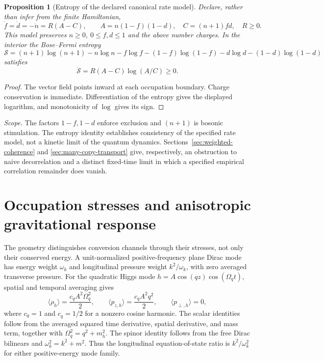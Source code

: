 \documentclass[11pt,a4paper,oneside]{book}
\theoremstyle{plain}
\newtheorem{proposition}[theorem]{Proposition}
\theoremstyle{definition}
\theoremstyle{remark}
\newcommand{\src}[2]{\cite{#1}}
\newcommand{\scope}[1]{\par\smallskip\noindent\textit{Scope.} #1\par\smallskip}
\begin{document}
\begin{proposition}[Entropy of the declared canonical rate model]
\label{prop:pauli-entropy}
Declare, rather than infer from the finite Hamiltonian,
\begin{equation}
 \dot f=\dot d=-\dot n=R(A-C),\qquad
 A=n(1-f)(1-d),\quad C=(n+1)fd,\quad R\ge0.
 \label{eq:canonical-rate-model}
\end{equation}
This model preserves $n\ge0$, $0\le f,d\le1$ and the above number
charges.  In the interior the Bose--Fermi entropy
\[
 \mathcal S=(n+1)\log(n+1)-n\log n
 -f\log f-(1-f)\log(1-f)-d\log d-(1-d)\log(1-d)
\]
satisfies
\begin{equation}
 \dot{\mathcal S}=R(A-C)\log(A/C)\ge0.
 \label{eq:pauli-entropy}
\end{equation}
\end{proposition}
\begin{proof}
The vector field points inward at each occupation boundary.  Charge
conservation is immediate.  Differentiation of the entropy gives the
displayed logarithm, and monotonicity of $\log$ gives its sign.
\end{proof}
\src{R20}{prop:v20v44-entropy}

\scope{The factors $1-f,1-d$ enforce exclusion and $(n+1)$ is bosonic
stimulation.  The entropy identity establishes consistency of the
specified rate model, not a kinetic limit of the quantum dynamics.
Sections~\ref{sec:weighted-coherence} and
\ref{sec:many-copy-transport} give, respectively, an obstruction to
naive decorrelation and a distinct fixed-time limit in which a specified
empirical correlation remainder does vanish.}


\section{Occupation stresses and anisotropic gravitational response}
\label{sec:kinetic-gravity}
The geometry distinguishes conversion channels through their stresses,
not only their conserved energy.  A unit-normalized positive-frequency
plane Dirac mode has energy weight $\omega_k$ and longitudinal pressure
weight $k^2/\omega_k$, with zero averaged transverse pressure.  For the
quadratic Higgs mode $h=A\cos(qz)\cos(\Omega_qt)$, spatial and temporal
averaging gives
\begin{equation}
 \langle\rho_h\rangle=\frac{c_qA^2\Omega_q^2}{2},\qquad
 \langle p_{z,h}\rangle=\frac{c_qA^2q^2}{2},\qquad
 \langle p_{\perp,h}\rangle=0,
 \label{eq:mode-averaged-stresses}
\end{equation}
where $c_0=1$ and $c_q=1/2$ for a nonzero cosine harmonic.  The scalar
identities follow from the averaged squared time derivative, spatial
derivative, and mass term, together with $\Omega_q^2=q^2+m_h^2$.
The spinor identity follows from the free Dirac bilinears and
$\omega_k^2=k^2+m^2$.  Thus the longitudinal equation-of-state ratio is
$k^2/\omega_k^2$ for either positive-energy mode family.
\src{R20}{thm:v20v36-eos}
\end{document}
